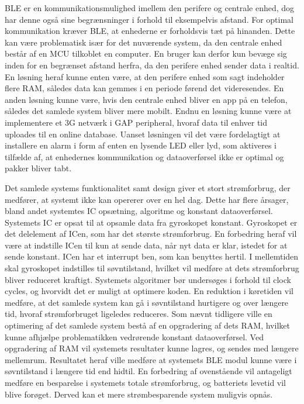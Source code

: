 BLE er en kommunikationsmulighed imellem den perifere og centrale enhed, dog har denne også sine begrænsninger i forhold til eksempelvis afstand. For optimal kommunikation kræver BLE, at enhederne er forholdsvis tæt på hinanden. Dette kan være problematisk især for det nuværende system, da den centrale enhed består af en MCU tilkoblet en computer. En bruger kan derfor kun bevæge sig inden for en begrænset afstand herfra, da den perifere enhed sender data i realtid. En løsning heraf kunne enten være, at den perifere enhed som sagt indeholder flere RAM, således data kan gemmes i en periode førend det videresendes. En anden løsning kunne være, hvis den centrale enhed bliver en app på en telefon, således det samlede system bliver mere mobilt. Endnu en løsning kunne være at implementere et 3G netværk i GAP peripheral, hvoraf data til enhver tid uploades til en online database. Uanset løsningen vil det være fordelagtigt at installere en alarm i form af enten en lysende LED eller lyd, som aktiveres i tilfælde af, at enhedernes kommunikation og dataoverførsel ikke er optimal og pakker bliver tabt. 

Det samlede systems funktionalitet samt design giver et stort strømforbrug, der medfører, at systemt ikke kan opererer over en hel dag. Dette har flere årsager, bland andet systemtes IC opsætning, algoritme og konstant dataoverførsel. Systemets IC er opsat til at opsamle data fra gyroskopet konstant. Gyroskopet er det delelement af ICen, som har det største strømforbrug. En forbedring heraf vil være at indstille ICen til kun at sende data, når nyt data er klar, istedet for at sende konstant. ICen har et interrupt ben, som kan benyttes hertil. I mellemtiden skal gyroskopet indstilles til søvntilstand, hvilket vil medføre at dets strømforbrug bliver reduceret kraftigt. Systemets algoritmer bør undersøges i forhold til clock cycles, og hvorvidt det er muligt at optimere koden. En reduktion i køretiden vil medføre, at det samlede system kan gå i søvntilstand hurtigere og over længere tid, hvoraf strømforbruget ligeledes reduceres. Som nævnt tidligere ville en optimering af det samlede system bestå af en opgradering af dets RAM, hvilket kunne afhjælpe problematikken vedrørende konstant dataoverførsel. Ved opgradering af RAM vil systemets resultater kunne lagres, og sendes med længere mellemrum. Resultatet heraf ville medføre at systemets BLE modul kunne være i søvntilstand i længere tid end hidtil. En forbedring af ovenstående vil antageligt medføre en besparelse i systemets totale strømforbrug, og batteriets levetid vil blive forøget. Derved kan et mere strømbesparende system muligvis opnås.

